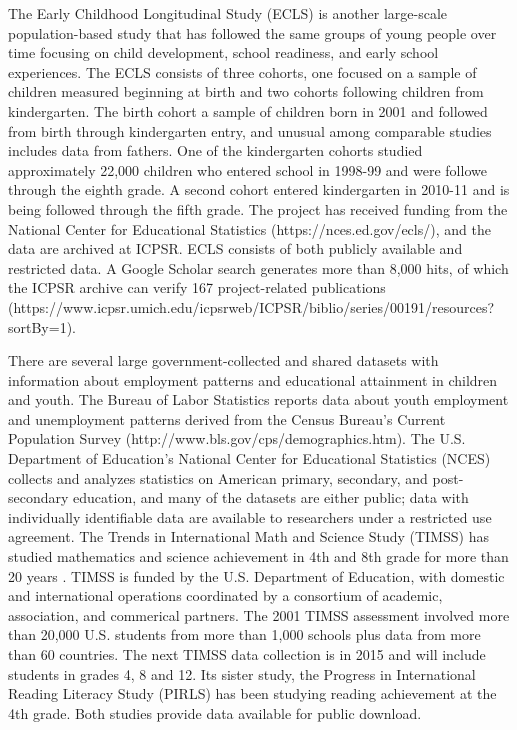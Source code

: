 \documentclass[letterpaper,man,apacite]{apa6}
\begin{document}
The Early Childhood Longitudinal Study (ECLS) is another large-scale population-based study that has followed the same groups of young people over time focusing on child development, school readiness, and early school experiences. 
The ECLS consists of three cohorts, one focused on a sample of children measured beginning at birth and two cohorts following children from kindergarten.
The birth cohort a sample of children born in 2001 and followed from birth through kindergarten entry, and unusual among comparable studies includes data from fathers. 
One of the kindergarten cohorts studied approximately 22,000 children who entered school in 1998-99 and were followe through the eighth grade. 
A second cohort entered kindergarten in 2010-11 and is being followed through the fifth grade.
The project has received funding from the National Center for Educational Statistics (https://nces.ed.gov/ecls/), and the data are archived at ICPSR.
ECLS consists of both publicly available and restricted data.
A Google Scholar search generates more than 8,000 hits, of which the ICPSR archive can verify 167 project-related publications (https://www.icpsr.umich.edu/icpsrweb/ICPSR/biblio/series/00191/resources?sortBy=1).

There are several large government-collected and shared datasets with information about employment patterns and educational attainment in children and youth.
The Bureau of Labor Statistics reports data about youth employment and unemployment patterns derived from the Census Bureau's Current Population Survey (http://www.bls.gov/cps/demographics.htm).
The U.S. Department of Education's National Center for Educational Statistics (NCES) collects and analyzes statistics on American primary, secondary, and post-secondary education, and many of the datasets are either public; data with individually identifiable data are available to researchers under a restricted use agreement.
The Trends in International Math and Science Study (TIMSS) has studied mathematics and science achievement in 4th and 8th grade for more than 20 years \cite{TIMSS}.
TIMSS is funded by the U.S. Department of Education, with domestic and international operations coordinated by a consortium of academic, association, and commerical partners.
The 2001 TIMSS assessment involved more than 20,000 U.S. students from more than 1,000 schools plus data from more than 60 countries.
The next TIMSS data collection is in 2015 and will include students in grades 4, 8 and 12.
Its sister study, the Progress in International Reading Literacy Study (PIRLS) has been studying reading achievement at the 4th grade.
Both studies provide data available for public download.
\end{document}
